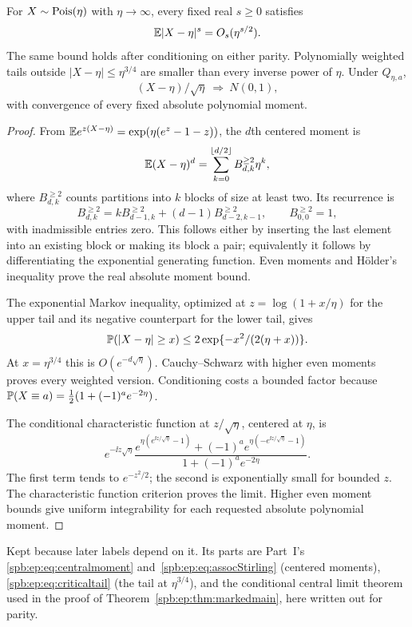 \begin{lemma}\label{spb:ml:lem:Poisson}
For $X\sim\operatorname{Pois}(\eta)$ with $\eta\to\infty$, every fixed real $s\ge0$ satisfies
\[
 \mathbb E|X-\eta|^s=O_s(\eta^{s/2}).
\]
The same bound holds after conditioning on either parity. Polynomially weighted tails outside $|X-\eta|\le\eta^{3/4}$ are smaller than every inverse power of $\eta$. Under $Q_{\eta,a}$,
\[
 (X-\eta)/\sqrt\eta\ \Longrightarrow\ N(0,1),
\]
with convergence of every fixed absolute polynomial moment.
\end{lemma}
\begin{proof}
From $\mathbb E e^{z(X-\eta)}=\exp(\eta(e^z-1-z))$, the $d$th centered moment is
\begin{equation}\label{spb:ml:eq:centeredmoments}
 \mathbb E(X-\eta)^d=\sum_{k=0}^{\lfloor d/2\rfloor}B_{d,k}^{\ge2}\eta^k,
\end{equation}
where $B_{d,k}^{\ge2}$ counts partitions into $k$ blocks of size at least two. Its recurrence is
\[
 B_{d,k}^{\ge2}=kB_{d-1,k}^{\ge2}+(d-1)B_{d-2,k-1}^{\ge2},\qquad B_{0,0}^{\ge2}=1,
\]
with inadmissible entries zero. This follows either by inserting the last element into an existing block or making its block a pair; equivalently it follows by differentiating the exponential generating function. Even moments and H\"older's inequality prove the real absolute moment bound.

The exponential Markov inequality, optimized at $z=\log(1+x/\eta)$ for the upper tail and its negative counterpart for the lower tail, gives
\begin{equation}\label{spb:ml:eq:Chernoff}
 \mathbb P(|X-\eta|\ge x)\le2\exp\{-x^2/(2(\eta+x))\}.
\end{equation}
At $x=\eta^{3/4}$ this is $O(e^{-d\sqrt\eta})$. Cauchy--Schwarz with higher even moments proves every weighted version. Conditioning costs a bounded factor because $\mathbb P(X\equiv a)=\frac12(1+(-1)^ae^{-2\eta})$.

The conditional characteristic function at $z/\sqrt\eta$, centered at $\eta$, is
\[
 e^{-\ii z\sqrt\eta}
 \frac{e^{\eta(e^{\ii z/\sqrt\eta}-1)}+
 (-1)^ae^{\eta(-e^{\ii z/\sqrt\eta}-1)}}{1+(-1)^ae^{-2\eta}}.
\]
The first term tends to $e^{-z^2/2}$; the second is exponentially small for bounded $z$. The characteristic function criterion proves the limit. Higher even moment bounds give uniform integrability for each requested absolute polynomial moment.
\end{proof}
\begin{writenote}[7 October 2026]
Kept because later labels depend on it. Its parts are Part~I's
\eqref{spb:ep:eq:centralmoment} and~\eqref{spb:ep:eq:assocStirling} (centered
moments), \eqref{spb:ep:eq:criticaltail} (the tail at $\eta^{3/4}$), and the
conditional central limit theorem used in the proof of
Theorem~\ref{spb:ep:thm:markedmain}, here written out for parity.
\end{writenote}

